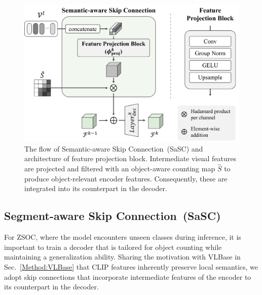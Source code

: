 \begin{figure}[t!]
    \begin{center}
    \includegraphics[width=\linewidth]{figs/SaSC.pdf}
    \end{center}
    \caption{
        The flow of Semantic-aware Skip Connection~(SaSC) and architecture of feature projection block.
        Intermediate visual features are projected and filtered with an object-aware counting map $\hat{S}$ to produce object-relevant encoder features. Consequently, these are integrated into its counterpart in the decoder.
    }
    \label{fig:SaSC}
\end{figure}



\subsection{Segment-aware Skip Connection~(SaSC)}
\label{Method:SaSC}
For ZSOC, where the model encounters unseen classes during inference, it is important to train a decoder that is tailored for object counting while maintaining a generalization ability.
Sharing the motivation with VLBase in Sec.~\ref{Method:VLBase} that CLIP features inherently preserve local semantics, we adopt skip connections that incorporate intermediate features of the encoder to its counterpart in the decoder.


